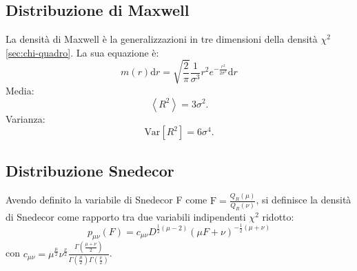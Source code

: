 \subsection{Distribuzione di Maxwell} %
\label{sec:maxwell}
La densità di Maxwell è la generalizzazioni in tre dimensioni della densità $\chi^2$ \ref{sec:chi-quadro}. La sua equazione è:
\begin{equation}
\label{eq:maxwell}
m\left( r \right) \textrm{d}r=\sqrt { \frac { 2 }{ \pi  }  } \frac { 1 }{ { \sigma  }^{ 3 } } { r }^{ 2 }{ e }^{ -\frac { { r }^{ 2 } }{ 2{ \sigma  }^{ 2 } }  }\textrm{d}r
\end{equation}
Media:
\begin{equation}
\left< { R }^{ 2 } \right> =3{ \sigma  }^{ 2 }.
\end{equation}
Varianza:
\begin{equation}
\textrm{Var}\left[ { R }^{ 2 } \right] =6{ \sigma  }^{ 4 }.
\end{equation}

\subsection{Distribuzione Snedecor} %
\label{sec:snedecor}
Avendo definito la variabile di Snedecor F come $\textrm{F}=\frac { { Q }_{ R }\left( \mu  \right)  }{ { Q }_{ R }\left( \nu  \right)  } $, si definisce la densità di Snedecor come rapporto tra due variabili indipendenti $\chi^2$ ridotto:
\begin{equation}
\label{eq:snedecor}
{ p }_{ \mu \nu  }\left( F \right) ={ c }_{ \mu \nu  }{ D }^{ \frac { 1 }{ 2 } \left( \mu -2 \right)  }{ \left( \mu F+\nu  \right)  }^{ -\frac { 1 }{ 2 } \left( \mu +\nu  \right)  }
\end{equation}
con ${ c }_{ \mu \nu  }={ \mu  }^{ \frac { \mu  }{ 2 }  }{ \nu  }^{ \frac { \nu  }{ 2 }  }\frac { \Gamma \left( \frac { \mu +\nu  }{ 2 }  \right)  }{ \Gamma \left( \frac { \mu  }{ 2 }  \right) \Gamma \left( \frac { \nu  }{ 2 }  \right)  } $.


